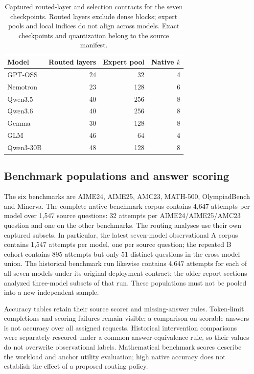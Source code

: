 \begin{table}[t]
\centering\small
\begin{tabular}{lrrr}
\toprule
Model & Routed layers & Expert pool & Native $k$ \\
\midrule
GPT-OSS & 24 & 32 & 4 \\
Nemotron & 23 & 128 & 6 \\
Qwen3.5 & 40 & 256 & 8 \\
Qwen3.6 & 40 & 256 & 8 \\
Gemma & 30 & 128 & 8 \\
GLM & 46 & 64 & 4 \\
Qwen3-30B & 48 & 128 & 8 \\
\bottomrule
\end{tabular}
\caption{Captured routed-layer and selection contracts for the seven
checkpoints. Routed layers exclude dense blocks; expert pools and local
indices do not align across models. Exact checkpoints and quantization
belong to the source manifest.}
\label{tab:model-routing-contracts}
\end{table}

\subsection{Benchmark populations and answer scoring}
The six benchmarks are AIME24, AIME25, AMC23, MATH-500, OlympiadBench and
Minerva. The complete native benchmark corpus contains 4,647 attempts per
model over 1,547 source questions: 32 attempts per AIME24/AIME25/AMC23
question and one on the other benchmarks. The routing analyses use their
own captured subsets. In particular, the latest seven-model observational
A corpus contains 1,547 attempts per model, one per source question; the
repeated B cohort contains 895 attempts but only 51 distinct questions in
the cross-model union. The historical benchmark run likewise contains
4,647 attempts for each of all seven models under its original deployment
contract; the older report sections analyzed three-model subsets of that
run. These populations must not be pooled into a new independent sample.



Accuracy tables retain their source scorer and missing-answer rules.
Token-limit completions and scoring failures remain visible; a comparison
on scorable answers is not accuracy over all assigned requests. Historical
intervention comparisons were separately rescored under a common
answer-equivalence rule, so their values do not overwrite observational
labels. Mathematical benchmark scores describe the workload and anchor
utility evaluation; high native accuracy does not establish the effect of
a proposed routing policy.

